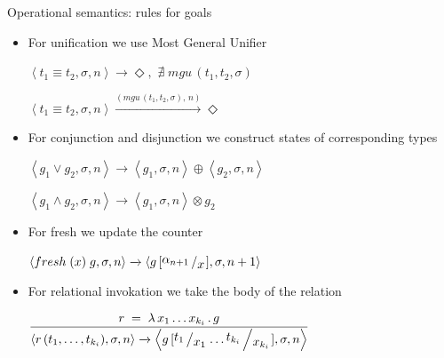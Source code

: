 \documentclass{beamer}
\newcommand{\inbr}[1]{\left<{#1}\right>}
\newcommand{\bigslant}[2]{{\raisebox{.2em}{$#1$}\left/\raisebox{-.2em}{$#2$}\right.}}
\theoremstyle{definition}
\theoremstyle{plain} %
\begin{document}
\begin{frame}{Operational semantics: rules for goals}

\begin{itemize}

\item For unification we use Most General Unifier

$\inbr{t_1 \equiv t_2, \sigma, n} \xrightarrow{} \Diamond , \, \, \nexists\; mgu\,(t_1, t_2, \sigma)$

$\inbr{t_1 \equiv t_2, \sigma, n} \xrightarrow{(mgu\,(t_1, t_2, \sigma),\, n)} \Diamond$

\pause

\vskip4mm

\item For conjunction and disjunction we construct states of corresponding types

$\inbr{g_1 \lor g_2, \sigma, n} \xrightarrow{} \inbr{g_1, \sigma, n} \oplus \inbr{g_2, \sigma, n}$

$\inbr{g_1 \land g_2, \sigma, n} \xrightarrow{} \inbr{ g_1, \sigma, n} \otimes g_2$

\pause

\vskip4mm

\item For fresh we update the counter

$\inbr{fresh \; (x) \; g, \sigma, n} \xrightarrow{} \inbr{g\,[\bigslant{\alpha_{n + 1}}{x}], \sigma, n + 1}$

\pause

\vskip4mm

\item For relational invokation we take the body of the relation

$\dfrac{r\;=\;\lambda\,x_1\dots x_{k_i}\,.\,g}{\inbr{r\,(t_1,\dots,t_{k_i}),\sigma,n} \xrightarrow{} \inbr{g\,[\bigslant{t_1}{x_1}\dots\bigslant{t_{k_i}}{x_{k_i}}], \sigma, n}}$

\end{itemize}

\end{frame}
\end{document}
